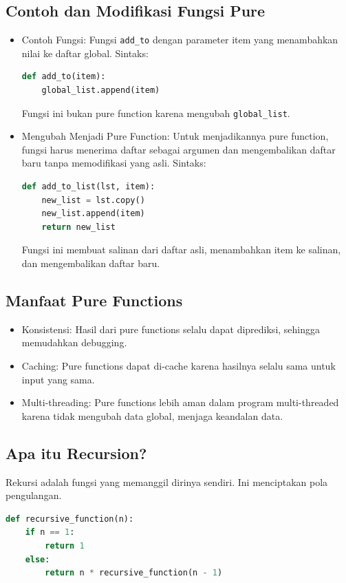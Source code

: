 \documentclass{article}
\begin{document}
\subsection{Contoh dan Modifikasi Fungsi Pure}
\begin{itemize}
    \item Contoh Fungsi: Fungsi \verb|add_to| dengan parameter item yang menambahkan nilai ke daftar global.
          Sintaks:
          \begin{lstlisting}[language=Python, caption={}, captionpos=b]
def add_to(item):
    global_list.append(item)
\end{lstlisting}
          Fungsi ini bukan pure function karena mengubah \verb|global_list|.

    \item Mengubah Menjadi Pure Function: Untuk menjadikannya pure function, fungsi harus menerima daftar sebagai argumen dan mengembalikan daftar baru tanpa memodifikasi yang asli.
          Sintaks:
          \begin{lstlisting}[language=Python, caption={}, captionpos=b]
def add_to_list(lst, item):
    new_list = lst.copy()
    new_list.append(item)
    return new_list
\end{lstlisting}
          Fungsi ini membuat salinan dari daftar asli, menambahkan item ke salinan, dan mengembalikan daftar baru.
\end{itemize}

\subsection{Manfaat Pure Functions}
\begin{itemize}
    \item Konsistensi: Hasil dari pure functions selalu dapat diprediksi, sehingga memudahkan debugging.
    \item Caching: Pure functions dapat di-cache karena hasilnya selalu sama untuk input yang sama.
    \item Multi-threading: Pure functions lebih aman dalam program multi-threaded karena tidak mengubah data global, menjaga keandalan data.
\end{itemize}

\subsection{Apa itu Recursion?}
Rekursi adalah fungsi yang memanggil dirinya sendiri. Ini menciptakan pola pengulangan.
\begin{lstlisting}[language=Python, caption={}, captionpos=b]
def recursive_function(n):
    if n == 1:
        return 1
    else:
        return n * recursive_function(n - 1)
\end{lstlisting}
\end{document}
